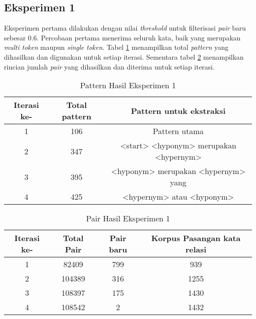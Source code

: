 \subsection{Eksperimen 1}
Eksperimen pertama dilakukan dengan nilai \textit{threshold} untuk filterisasi \textit{pair} baru sebesar 0.6. Percobaan pertama menerima seluruh kata, baik yang merupakan \textit{multi token} maupun \textit{single token}. Tabel \ref{table:eksp1-pattern} menampilkan total \textit{pattern} yang dihasilkan dan digunakan untuk setiap iterasi. Sementara tabel \ref{table:eksp1-pair} menampilkan rincian jumlah \textit{pair} yang dihasilkan dan diterima untuk setiap iterasi.

\begin{table}
  \centering
  \caption{Pattern Hasil Eksperimen 1}
  \label{table:eksp1-pattern}
  \begin{tabular}{|c|c|c|}
  \hline
  Iterasi ke- & Total pattern & Pattern untuk ekstraksi                 \\ \hline
  1           & 106           & Pattern utama                           \\ \hline
  2           & 347           & <start> <hyponym> merupakan <hypernym>  \\ \hline
  3           & 395           & <hyponym> merupakan <hypernym> yang     \\ \hline
  4           & 425           & <hypernym> atau <hyponym>               \\ \hline
  \end{tabular} 
\end{table}

\begin{table}
  \centering
  \caption{Pair Hasil Eksperimen 1}
  \label{table:eksp1-pair}
  \begin{tabular}{|c|c|c|c|}
  \hline
  Iterasi ke-  & Total Pair & Pair baru & Korpus Pasangan kata relasi \\ \hline
  1            & 82409      & 799       & 939  \\ \hline
  2            & 104389     & 316       & 1255 \\ \hline
  3            & 108397     & 175       & 1430 \\ \hline
  4            & 108542     & 2         & 1432 \\ \hline
  \end{tabular} 
\end{table}

